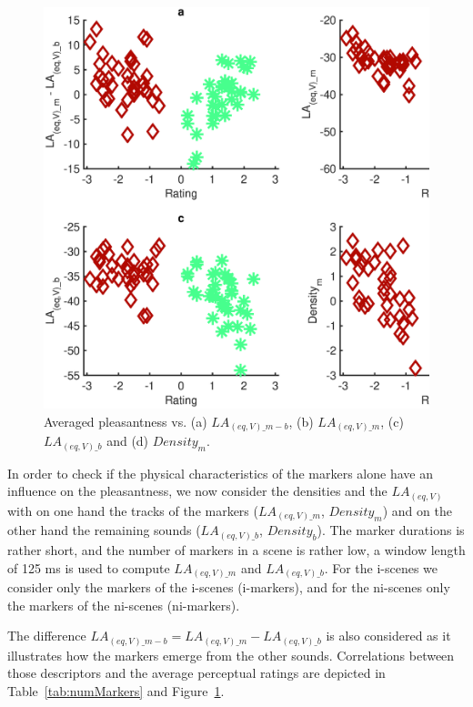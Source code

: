 \documentclass[twoside,twocolumn]{article}
\begin{document}
\begin{figure}[t]
\begin{center}
\includegraphics[width=.4\paperwidth]{../gfxMatlab/xp1_deSoLvMar_1.eps}
  \caption{\label{fig:numMarkers} Averaged pleasantness vs. (a)  $LA_{(eq,V)\_m-b}$, (b) $LA_{(eq,V)\_m}$, (c) $LA_{(eq,V)\_b}$ and (d) $Density_m$.}
  \end{center}
\end{figure}

In order to check if the physical characteristics of the markers alone have an influence on the pleasantness, we now consider the densities and the $LA_{(eq,V)}$ with on one hand the tracks of the markers ($LA_{(eq,V)\_m}$, $Density_{m}$) and on the other hand the remaining sounds ($LA_{(eq,V)\_b}$, $Density_{b}$). The marker durations is rather short, and the number of markers in a scene is rather low, a window length of 125 ms is used to compute $LA_{(eq,V)\_m}$ and $LA_{(eq,V)\_b}$. For the i-scenes we consider only the markers of the i-scenes (i-markers), and for the ni-scenes only the markers of the ni-scenes (ni-markers). 

The difference $LA_{(eq,V)\_m-b}=LA_{(eq,V)\_m}-LA_{(eq,V)\_b}$ is also considered as it illustrates how the markers emerge from the other sounds. Correlations between those descriptors and the average perceptual ratings are depicted in Table~\ref{tab:numMarkers} and Figure~\ref{fig:numMarkers}.
\end{document}
